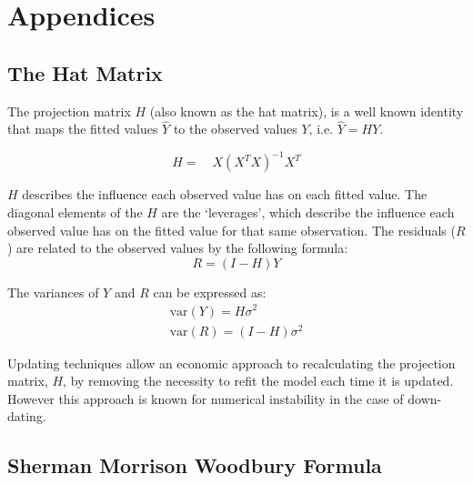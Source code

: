 \documentclass[12pt, a4paper]{article}
\begin{document}
\chapter{Appendices} %
\newpage
\section{The Hat Matrix} %

The projection matrix $H$ (also known as the hat matrix), is a
well known identity that maps the fitted values $\hat{Y}$ to the
observed values $Y$, i.e. $\hat{Y} = HY$.

\begin{equation}
H =\quad X(X^{T}X)^{-1}X^{T}
\end{equation}

$H$ describes the influence each observed value has on each fitted
value. The diagonal elements of the $H$ are the `leverages', which
describe the influence each observed value has on the fitted value
for that same observation. The residuals ($R$) are related to the
observed values by the following formula:
\begin{equation}
R = (I-H)Y
\end{equation}

The variances of $Y$ and $R$ can be expressed as:
\begin{eqnarray}
\mbox{var}(Y) = H\sigma^{2} \nonumber\\
\mbox{var}(R) = (I-H)\sigma^{2}
\end{eqnarray}

Updating techniques allow an economic approach to recalculating
the projection matrix, $H$, by removing the necessity to refit the
model each time it is updated. However this approach is known for
numerical instability in the case of down-dating.

\section{Sherman Morrison Woodbury Formula} %
\end{document}
